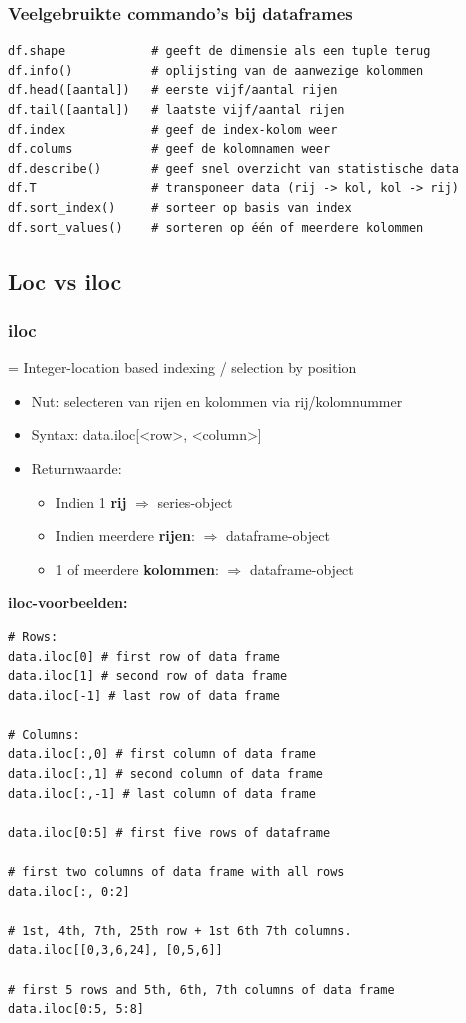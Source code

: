 \documentclass{article}
\begin{document}
\subsubsection{Veelgebruikte commando's bij dataframes}

\begin{verbatim}
df.shape            # geeft de dimensie als een tuple terug
df.info()           # oplijsting van de aanwezige kolommen
df.head([aantal])   # eerste vijf/aantal rijen
df.tail([aantal])   # laatste vijf/aantal rijen
df.index            # geef de index-kolom weer
df.colums           # geef de kolomnamen weer
df.describe()       # geef snel overzicht van statistische data
df.T                # transponeer data (rij -> kol, kol -> rij)
df.sort_index()     # sorteer op basis van index
df.sort_values()    # sorteren op één of meerdere kolommen
\end{verbatim}


\subsection{Loc vs iloc}

\subsubsection{iloc}

= Integer-location based indexing / selection by position

\begin{itemize}
    \item Nut: selecteren van rijen en kolommen via rij/kolomnummer
    \item Syntax: data.iloc[<row>, <column>]
    \item Returnwaarde:
    \begin{itemize}
        \item Indien 1 \textbf{rij} $\Rightarrow$ series-object
        \item Indien meerdere \textbf{rijen}: $\Rightarrow$ dataframe-object
        \item 1 of meerdere \textbf{kolommen}: $\Rightarrow$ dataframe-object 
    \end{itemize}
\end{itemize}

\textbf{iloc-voorbeelden:}

\begin{verbatim}
# Rows:
data.iloc[0] # first row of data frame
data.iloc[1] # second row of data frame
data.iloc[-1] # last row of data frame

# Columns:
data.iloc[:,0] # first column of data frame
data.iloc[:,1] # second column of data frame
data.iloc[:,-1] # last column of data frame

data.iloc[0:5] # first five rows of dataframe

# first two columns of data frame with all rows
data.iloc[:, 0:2] 

# 1st, 4th, 7th, 25th row + 1st 6th 7th columns.
data.iloc[[0,3,6,24], [0,5,6]]  

# first 5 rows and 5th, 6th, 7th columns of data frame
data.iloc[0:5, 5:8]

\end{verbatim}
\end{document}
